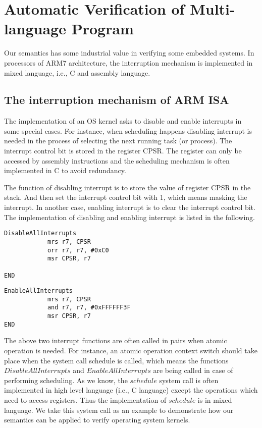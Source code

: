 \documentclass[conference]{IEEEtran}
\begin{document}
\section{Automatic Verification of Multi-language Program}
\par Our semantics has some industrial value in verifying some embedded systems. In processors of ARM7 architecture, the interruption mechanism is implemented in mixed language, i.e., C and assembly language.
\subsection{The interruption mechanism of ARM ISA}
\par The implementation of an OS kernel asks to disable and enable interrupts in some special cases. For instance, when scheduling happens disabling interrupt is needed in the process of selecting the next running task (or process). The interrupt control bit is stored in the register CPSR. The register can only be accessed by assembly instructions and the scheduling mechanism is often implemented in C to avoid redundancy.
\par The function of disabling interrupt is to store the value of register CPSR in the stack. And then set the interrupt control bit with 1, which means masking the interrupt. In another case, enabling interrupt is to clear the interrupt control bit. The implementation of disabling and enabling interrupt is listed in the following.
\begin{lstlisting}[xleftmargin=1em]
DisableAllInterrupts					
			mrs r7, CPSR								
			orr r7, r7, #0xC0						
			msr CPSR, r7								
			
END	
\end{lstlisting}

\begin{lstlisting}[xleftmargin=1em]
EnableAllInterrupts																		
			mrs r7, CPSR								
			and r7, r7, #0xFFFFFF3F			
			msr CPSR, r7							
END									
\end{lstlisting}
\par The above two interrupt functions are often called in pairs when atomic operation is needed. For instance, an atomic operation context switch should take place when the system call schedule is called, which means the functions $DisableAllInterrupts$ and $EnableAllInterrupts$ are being called in case of performing scheduling. As we know, the $schedule$ system call is often implemented in high level language (i.e., C language) except the operations which need to access registers. Thus the implementation of $schedule$ is in mixed language. We take this system call as an example to demonstrate how our semantics can be applied to verify operating system kernels.
\end{document}
